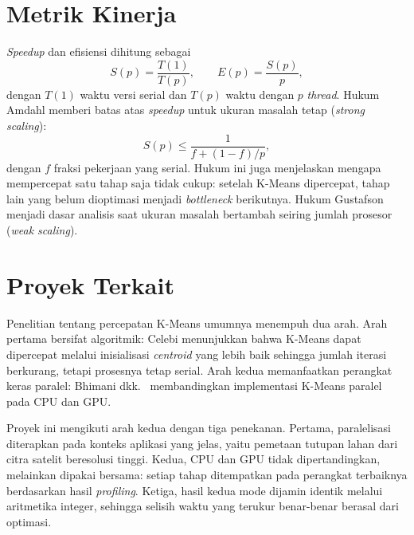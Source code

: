 \section{Metrik Kinerja}
\emph{Speedup} dan efisiensi dihitung sebagai
\begin{equation}
    S(p) = \frac{T(1)}{T(p)}, \qquad E(p) = \frac{S(p)}{p},
    \label{eq:speedup}
\end{equation}
dengan $T(1)$ waktu versi serial dan $T(p)$ waktu dengan $p$ \emph{thread}. Hukum Amdahl \cite{amdahl1967} memberi batas atas \emph{speedup} untuk ukuran masalah tetap (\emph{strong scaling}):
\begin{equation}
    S(p) \le \frac{1}{f + (1-f)/p},
    \label{eq:amdahl}
\end{equation}
dengan $f$ fraksi pekerjaan yang serial. Hukum ini juga menjelaskan mengapa mempercepat satu tahap saja tidak cukup: setelah K-Means dipercepat, tahap lain yang belum dioptimasi menjadi \emph{bottleneck} berikutnya. Hukum Gustafson \cite{gustafson1988} menjadi dasar analisis saat ukuran masalah bertambah seiring jumlah prosesor (\emph{weak scaling}).

\section{Proyek Terkait}
Penelitian tentang percepatan K-Means umumnya menempuh dua arah. Arah pertama bersifat algoritmik: Celebi \cite{celebi2011} menunjukkan bahwa K-Means dapat dipercepat melalui inisialisasi \emph{centroid} yang lebih baik sehingga jumlah iterasi berkurang, tetapi prosesnya tetap serial. Arah kedua memanfaatkan perangkat keras paralel: Bhimani dkk.\ \cite{bhimani2015} membandingkan implementasi K-Means paralel pada CPU dan GPU.

Proyek ini mengikuti arah kedua dengan tiga penekanan. Pertama, paralelisasi diterapkan pada konteks aplikasi yang jelas, yaitu pemetaan tutupan lahan dari citra satelit beresolusi tinggi. Kedua, CPU dan GPU tidak dipertandingkan, melainkan dipakai bersama: setiap tahap ditempatkan pada perangkat terbaiknya berdasarkan hasil \emph{profiling}. Ketiga, hasil kedua mode dijamin identik melalui aritmetika integer, sehingga selisih waktu yang terukur benar-benar berasal dari optimasi.
